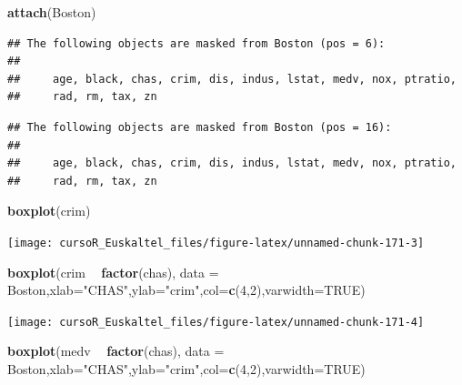 \documentclass[]{book}
\newenvironment{Shaded}{\begin{snugshade}}{\end{snugshade}}
\newcommand{\KeywordTok}[1]{\textcolor[rgb]{0.13,0.29,0.53}{\textbf{#1}}}
\newcommand{\DataTypeTok}[1]{\textcolor[rgb]{0.13,0.29,0.53}{#1}}
\newcommand{\DecValTok}[1]{\textcolor[rgb]{0.00,0.00,0.81}{#1}}
\newcommand{\StringTok}[1]{\textcolor[rgb]{0.31,0.60,0.02}{#1}}
\newcommand{\OtherTok}[1]{\textcolor[rgb]{0.56,0.35,0.01}{#1}}
\newcommand{\OperatorTok}[1]{\textcolor[rgb]{0.81,0.36,0.00}{\textbf{#1}}}
\newcommand{\NormalTok}[1]{#1}
\begin{document}
\begin{Shaded}
\begin{Highlighting}[]
\KeywordTok{attach}\NormalTok{(Boston)}
\end{Highlighting}
\end{Shaded}

\begin{verbatim}
## The following objects are masked from Boston (pos = 6):
## 
##     age, black, chas, crim, dis, indus, lstat, medv, nox, ptratio,
##     rad, rm, tax, zn
\end{verbatim}

\begin{verbatim}
## The following objects are masked from Boston (pos = 16):
## 
##     age, black, chas, crim, dis, indus, lstat, medv, nox, ptratio,
##     rad, rm, tax, zn
\end{verbatim}

\begin{Shaded}
\begin{Highlighting}[]
\KeywordTok{boxplot}\NormalTok{(crim)}
\end{Highlighting}
\end{Shaded}

\begin{center}\texttt{[image: cursoR\_Euskaltel\_files/figure-latex/unnamed-chunk-171-3]} \end{center}

\begin{Shaded}
\begin{Highlighting}[]
\KeywordTok{boxplot}\NormalTok{(crim }\OperatorTok{~}\StringTok{ }\KeywordTok{factor}\NormalTok{(chas), }\DataTypeTok{data =}\NormalTok{ Boston,}\DataTypeTok{xlab=}\StringTok{"CHAS"}\NormalTok{,}\DataTypeTok{ylab=}\StringTok{"crim"}\NormalTok{,}\DataTypeTok{col=}\KeywordTok{c}\NormalTok{(}\DecValTok{4}\NormalTok{,}\DecValTok{2}\NormalTok{),}\DataTypeTok{varwidth=}\OtherTok{TRUE}\NormalTok{)}
\end{Highlighting}
\end{Shaded}

\begin{center}\texttt{[image: cursoR\_Euskaltel\_files/figure-latex/unnamed-chunk-171-4]} \end{center}

\begin{Shaded}
\begin{Highlighting}[]
\KeywordTok{boxplot}\NormalTok{(medv }\OperatorTok{~}\StringTok{ }\KeywordTok{factor}\NormalTok{(chas), }\DataTypeTok{data =}\NormalTok{ Boston,}\DataTypeTok{xlab=}\StringTok{"CHAS"}\NormalTok{,}\DataTypeTok{ylab=}\StringTok{"crim"}\NormalTok{,}\DataTypeTok{col=}\KeywordTok{c}\NormalTok{(}\DecValTok{4}\NormalTok{,}\DecValTok{2}\NormalTok{),}\DataTypeTok{varwidth=}\OtherTok{TRUE}\NormalTok{)}
\end{Highlighting}
\end{Shaded}
\end{document}
